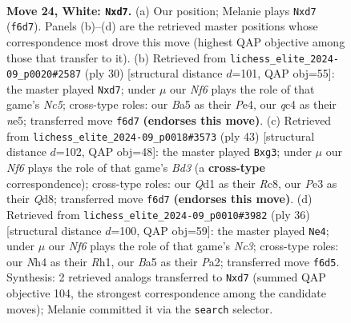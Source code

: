 \documentclass[11pt]{article}
\begin{document}
\clearpage

\begin{figure}[p]\centering
\begin{subfigure}{0.46\textwidth}\centering
\resizebox{\linewidth}{!}{%
\newchessgame
\chessboard[
  setfen={1nr5/rp1bbpk1/p3pN2/B5p1/2q1B2N/4P3/PP3PPP/R2QR1K1 w - - 3 24},
  showmover=false,
  pgfstyle=straightmove, color=movearrow, markmove={f6-d7}
]}
\caption{}
\end{subfigure}\hfill
\begin{subfigure}{0.46\textwidth}\centering
\resizebox{\linewidth}{!}{%
\newchessgame
\chessboard[
  setfen={r4rk1/ppqb1p1p/4pp2/2N1n3/2B1P3/2P5/P4PPP/R2Q1RK1 w - - 0 16},
  showmover=false,
  pgfstyle=straightmove, color=movearrow, markmove={c5-d7}
]}
\caption{}
\end{subfigure}
\\[4pt]
\begin{subfigure}{0.46\textwidth}\centering
\resizebox{\linewidth}{!}{%
\newchessgame
\chessboard[
  setfen={2rq1rk1/5ppp/3bp3/p2P1n2/2p1Q3/2P2NB1/P4PPP/R3R1K1 b - - 0 22},
  showmover=false,
  pgfstyle=straightmove, color=movearrow, markmove={d6-g3}
]}
\caption{}
\end{subfigure}\hfill
\begin{subfigure}{0.46\textwidth}\centering
\resizebox{\linewidth}{!}{%
\newchessgame
\chessboard[
  setfen={r2r2k1/4bppp/p3pn2/4q1B1/1p5Q/2N2P2/PPP4P/1K4RR w - - 0 19},
  showmover=false,
  pgfstyle=straightmove, color=movearrow, markmove={c3-e4}
]}
\caption{}
\end{subfigure}
\caption{\textbf{Move 24, White: \texttt{Nxd7}.} (a) Our position; Melanie plays \texttt{Nxd7} (\texttt{f6d7}). Panels (b)--(d) are the retrieved master positions whose correspondence most drove this move (highest QAP objective among those that transfer to it). (b) Retrieved from \texttt{lichess\_elite\_2024-09\_p0020\#2587} (ply 30) [structural distance $d$=101, QAP obj=55]: the master played \texttt{Nxd7}; under $\mu$ our \emph{Nf6} plays the role of that game's \emph{Nc5}; cross-type roles: our \emph{B}a5 as their \emph{P}e4, our \emph{q}c4 as their \emph{n}e5; transferred move \texttt{f6d7} \textbf{(endorses this move)}. (c) Retrieved from \texttt{lichess\_elite\_2024-09\_p0018\#3573} (ply 43) [structural distance $d$=102, QAP obj=48]: the master played \texttt{Bxg3}; under $\mu$ our \emph{Nf6} plays the role of that game's \emph{Bd3} (a \textbf{cross-type} correspondence); cross-type roles: our \emph{Q}d1 as their \emph{R}c8, our \emph{P}e3 as their \emph{Q}d8; transferred move \texttt{f6d7} \textbf{(endorses this move)}. (d) Retrieved from \texttt{lichess\_elite\_2024-09\_p0010\#3982} (ply 36) [structural distance $d$=100, QAP obj=59]: the master played \texttt{Ne4}; under $\mu$ our \emph{Nf6} plays the role of that game's \emph{Nc3}; cross-type roles: our \emph{N}h4 as their \emph{R}h1, our \emph{B}a5 as their \emph{P}a2; transferred move \texttt{f6d5}. Synthesis: 2 retrieved analogs transferred to \texttt{Nxd7} (summed QAP objective 104, the strongest correspondence among the candidate moves); Melanie committed it via the \texttt{search} selector.}
\label{fig:thought-m46}
\end{figure}
\end{document}
